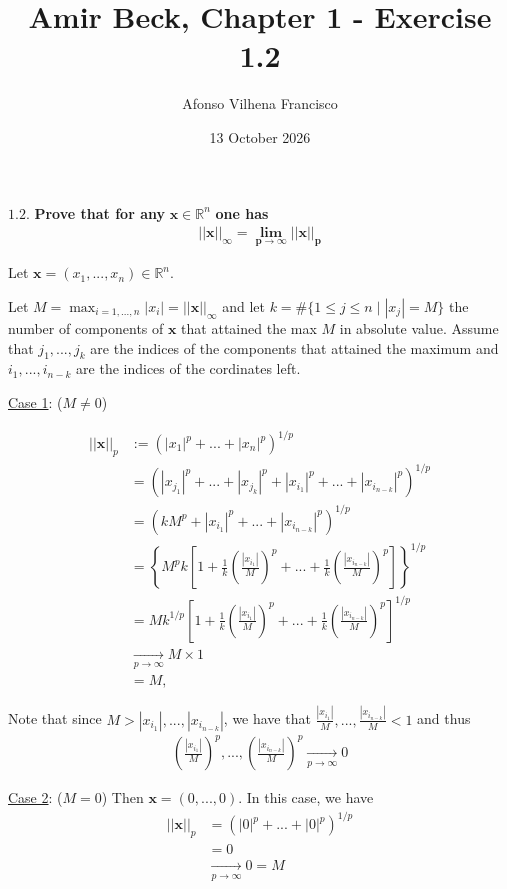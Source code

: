 \documentclass{article}
\title{Amir Beck, Chapter 1 - Exercise 1.2}
\author{Afonso Vilhena Francisco}
\date{13 October 2026}
\begin{document}
\maketitle

$\mathbf{1.2.}$ \textbf{Prove that for any} $\mathbf{x} \in \mathbb{R}^n$ \textbf{one has}
\begin{align*}
    ||\mathbf{x}||_\infty= \mathbf{\lim_{p \rightarrow \infty}||x||_p}
\end{align*}

\vspace{0.5cm}

Let $\mathbf{x}=(x_1,...,x_n) \in \mathbb{R}^n$.

Let $M=\max_{i=1,...,n} |x_i|=||\mathbf{x}||_{\infty}$ and let $k=\#\{1 \leq j \leq n\mid |x_j|=M \}$ the number of components of $\mathbf{x}$ that attained the max $M$ in absolute value. Assume that $j_1,...,j_k$ are the indices of the components that attained the maximum and $i_1,...,i_{n-k}$ are the indices of the cordinates left.


\vspace{0.4cm}

\underline{Case 1}: ($M \neq 0$)

\begin{align*}
    ||\mathbf{x}||_p &:= (|x_1|^p+...+|x_n|^p)^{1/p}\\
                     & = ( |x_{j_1}|^p+...+|x_{j_k}|^p+ |x_{i_1}|^p+...+|x_{i_{n-k}}|^p)^{1/p}\\
                     & = (kM^p+ |x_{i_1}|^p+...+|x_{i_{n-k}}|^p)^{1/p}\\
                     & = \left\{ M^pk \left[ 1+ \frac{1}{k}\left(\frac{|x_{i_1}|}{M}\right)^p+...+\frac{1}{k}\left(\frac{|x_{i_{n-k}}|}{M}\right)^p \right] \right\}^{1/p}\\
                     & = Mk^{1/p} \left[ 1+ \frac{1}{k}\left(\frac{|x_{i_1}|}{M}\right)^p+...+\frac{1}{k}\left(\frac{|x_{i_{n-k}}|}{M}\right)^p \right]^{1/p}\\
                     & \underset{p \rightarrow \infty}{\longrightarrow} M \times 1\\
                     & = M,
\end{align*}

Note that since $M>|x_{i_1}|,...,|x_{i_{n-k}}|$, we have that $\frac{|x_{i_1}|}{M},...,\frac{|x_{i_{n-k}}|}{M}<1$ and thus
\begin{align*}
    \left( \frac{|x_{i_1}|}{M} \right)^p,...,\left( \frac{|x_{i_{n-k}}|}{M} \right)^p \underset{p \rightarrow \infty}{\longrightarrow} 0
\end{align*}

\underline{Case 2}: ($M=0$) Then $\mathbf{x}=(0,...,0)$. In this case, we have
\begin{align*}
    ||\mathbf{x}||_{p} &= (|0|^p+...+|0|^p)^{1/p}\\
                       &= 0\\
                       & \underset{p \rightarrow \infty}{\longrightarrow} 0 = M
\end{align*}
\end{document}
